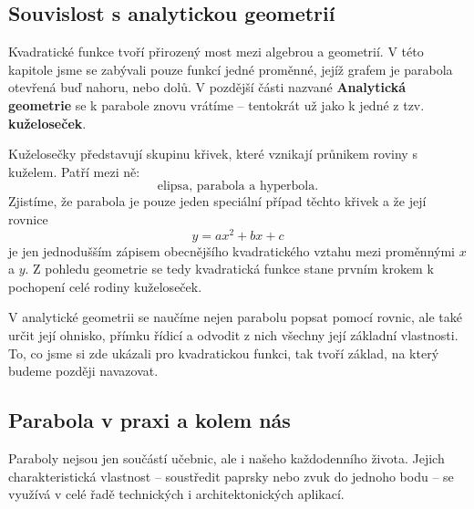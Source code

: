 \documentclass[12pt,a4paper]{article}
\begin{document}
\subsection{Souvislost s analytickou geometrií}

Kvadratické funkce tvoří přirozený most mezi algebrou a geometrií.  
V této kapitole jsme se zabývali pouze funkcí jedné proměnné, jejíž grafem je parabola otevřená buď nahoru, nebo dolů.  
V pozdější části nazvané \textbf{Analytická geometrie} se k parabole znovu vrátíme – tentokrát už jako k jedné z tzv. \textbf{kuželoseček}.

\medskip
Kuželosečky představují skupinu křivek, které vznikají průnikem roviny s kuželem.  
Patří mezi ně:
\[
\text{elipsa, parabola a hyperbola.}
\]
Zjistíme, že parabola je pouze jeden speciální případ těchto křivek a že její rovnice
\[
y = ax^2 + bx + c
\]
je jen jednodušším zápisem obecnějšího kvadratického vztahu mezi proměnnými \(x\) a \(y\).  
Z pohledu geometrie se tedy kvadratická funkce stane prvním krokem k pochopení celé rodiny kuželoseček.

\begin{notebox}
V analytické geometrii se naučíme nejen parabolu popsat pomocí rovnic, ale také určit její ohnisko, přímku řídicí a odvodit z nich všechny její základní vlastnosti.  
To, co jsme si zde ukázali pro kvadratickou funkci, tak tvoří základ, na který budeme později navazovat.
\end{notebox}

\subsection{Parabola v praxi a kolem nás}

Paraboly nejsou jen součástí učebnic, ale i našeho každodenního života.  
Jejich charakteristická vlastnost – soustředit paprsky nebo zvuk do jednoho bodu – se využívá v celé řadě technických i architektonických aplikací.
\end{document}
